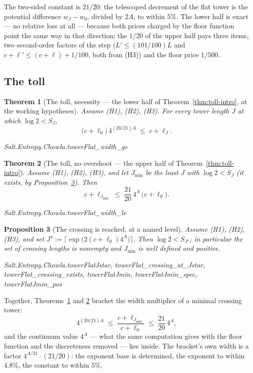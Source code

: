 \documentclass[11pt]{amsart}
\newcommand{\leanname}[1]{\par{\noindent\small\ttfamily\raggedright #1\par}}
\newtheorem{theorem}{Theorem}[section]
\newtheorem{proposition}[theorem]{Proposition}
\theoremstyle{remark}
\begin{document}
The two-sided constant is $21/20$: the telescoped decrement of the flat
tower is the potential difference $w_J - w_0$, divided by $2A$, to within
$5\%$. The lower half is exact --- no relative loss at all --- because both
prices charged by the floor function point the same way in that direction;
the $1/20$ of the upper half pays three items, two second-order factors of
the step ($L' \le (101/100)L$ and $c + \ell' \le (c+\ell) + 1/100$,
both from (H3)) and the floor price $1/500$.

\subsection{The toll}

\begin{theorem}[The toll, necessity --- the lower half of Theorem~\ref{thm:toll-intro}, at the working hypotheses]\label{thm:tollge}
Assume (H1), (H2), (H3). For \emph{every} tower length $J$ at which
$\log 2 < S_J$,
\[
\bigl(c + \ell_0\bigr)\, 4^{(20/21)A} \;\le\; c + \ell_J .
\]
\leanname{Salt.Entropy.Chowla.towerFlat\_width\_ge}
\end{theorem}

\begin{theorem}[The toll, no overshoot --- the upper half of Theorem~\ref{thm:toll-intro}]\label{thm:tollle}
Assume (H1), (H2), (H3), and let $J_{\min}$ be the least $J$ with
$\log 2 < S_J$ (it exists, by Proposition~\ref{prop:crossing}). Then
\[
c + \ell_{J_{\min}} \;\le\; \frac{21}{20}\,4^{A}\,\bigl(c + \ell_0\bigr).
\]
\leanname{Salt.Entropy.Chowla.towerFlat\_width\_le}
\end{theorem}

\begin{proposition}[The crossing is reached, at a named
level]\label{prop:crossing}
Assume (H1), (H2), (H3), and set
$J^{\star} := \bigl\lceil \exp\bigl(2(c+\ell_0)4^{A}\bigr)\bigr\rceil$.
Then $\log 2 < S_{J^{\star}}$; in particular the set of crossing lengths
is nonempty and $J_{\min}$ is well defined and positive.
\leanname{Salt.Entropy.Chowla.\allowbreak towerFlatJstar,
towerFlat\_crossing\_at\_Jstar, towerFlat\_crossing\_exists,
towerFlatJmin, towerFlatJmin\_spec, towerFlatJmin\_pos}
\end{proposition}

Together, Theorems~\ref{thm:tollge} and \ref{thm:tollle} bracket the width
multiplier of a minimal crossing tower:
\begin{equation}\label{eq:bracket}
4^{(20/21)A} \;\le\; \frac{c+\ell_{J_{\min}}}{c+\ell_0}
\;\le\; \frac{21}{20}\,4^{A},
\end{equation}
and the continuum value $4^{A}$ --- what the same computation gives with
the floor function and the discreteness removed --- lies inside. The
bracket's own width is a factor $4^{A/21}\cdot(21/20)$: the exponent base
is determined, the exponent to within $4.8\%$, the constant to within
$5\%$.
\end{document}
